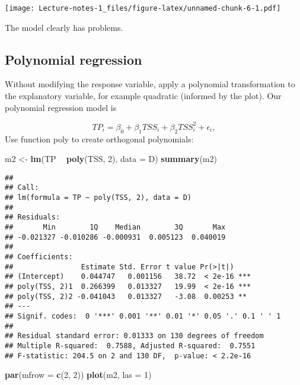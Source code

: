 \documentclass[
]{book}
\newenvironment{Shaded}{\begin{snugshade}}{\end{snugshade}}
\newcommand{\DataTypeTok}[1]{\textcolor[rgb]{0.13,0.29,0.53}{#1}}
\newcommand{\DecValTok}[1]{\textcolor[rgb]{0.00,0.00,0.81}{#1}}
\newcommand{\KeywordTok}[1]{\textcolor[rgb]{0.13,0.29,0.53}{\textbf{#1}}}
\newcommand{\NormalTok}[1]{#1}
\newcommand{\OperatorTok}[1]{\textcolor[rgb]{0.81,0.36,0.00}{\textbf{#1}}}
\newcommand{\StringTok}[1]{\textcolor[rgb]{0.31,0.60,0.02}{#1}}
\begin{document}
\texttt{[image: Lecture-notes-1\_files/figure-latex/unnamed-chunk-6-1.pdf]}

The model clearly has problems.

\hypertarget{polynomial-regression}{%
\subsection{Polynomial regression}\label{polynomial-regression}}

Without modifying the response variable, apply a polynomial transformation to the explanatory variable, for example quadratic (informed by the plot). Our polynomial regression model is

\[TP_i = \beta_0 + \beta_1 TSS_i + \beta_2 TSS^2_i + \epsilon_i,\]
Use function poly to create orthogonal polynomials:

\begin{Shaded}
\begin{Highlighting}[]
\NormalTok{m2 <-}\StringTok{ }\KeywordTok{lm}\NormalTok{(TP }\OperatorTok{~}\StringTok{ }\KeywordTok{poly}\NormalTok{(TSS, }\DecValTok{2}\NormalTok{), }\DataTypeTok{data =}\NormalTok{ D)}
\KeywordTok{summary}\NormalTok{(m2)}
\end{Highlighting}
\end{Shaded}

\begin{verbatim}
## 
## Call:
## lm(formula = TP ~ poly(TSS, 2), data = D)
## 
## Residuals:
##       Min        1Q    Median        3Q       Max 
## -0.021327 -0.010286 -0.000931  0.005123  0.040019 
## 
## Coefficients:
##                Estimate Std. Error t value Pr(>|t|)    
## (Intercept)    0.044747   0.001156   38.72  < 2e-16 ***
## poly(TSS, 2)1  0.266399   0.013327   19.99  < 2e-16 ***
## poly(TSS, 2)2 -0.041043   0.013327   -3.08  0.00253 ** 
## ---
## Signif. codes:  0 '***' 0.001 '**' 0.01 '*' 0.05 '.' 0.1 ' ' 1
## 
## Residual standard error: 0.01333 on 130 degrees of freedom
## Multiple R-squared:  0.7588, Adjusted R-squared:  0.7551 
## F-statistic: 204.5 on 2 and 130 DF,  p-value: < 2.2e-16
\end{verbatim}

\begin{Shaded}
\begin{Highlighting}[]
\KeywordTok{par}\NormalTok{(}\DataTypeTok{mfrow =} \KeywordTok{c}\NormalTok{(}\DecValTok{2}\NormalTok{, }\DecValTok{2}\NormalTok{))}
\KeywordTok{plot}\NormalTok{(m2, }\DataTypeTok{las =} \DecValTok{1}\NormalTok{)}
\end{Highlighting}
\end{Shaded}
\end{document}
